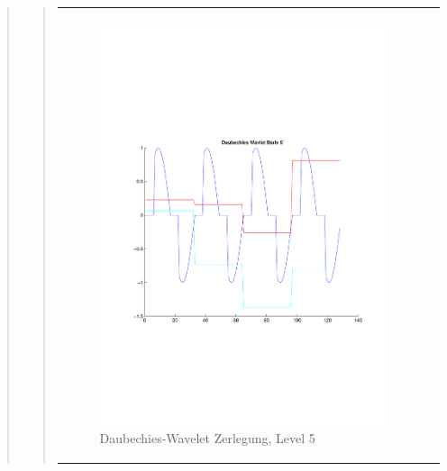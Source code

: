 \begin{quote}
\begin{quote}
\begin{center}
\begin{tabular}{ll}
\begin{minipage}{0.6\textwidth}
                    \end{minipage}
                    \begin{minipage}{0.6\textwidth}
    
                        \begin{figure}[H]
                            \label{fig:}
                            \includegraphics[scale=0.45, trim = 0.8cm 6cm 3cm
                            7.5cm,
                            clip]{./Bilder/Termin8/Daubechies_Wavlet_lvl_5}
                            \caption{Daubechies-Wavelet Zerlegung, Level 5}
                        \end{figure}
                    \vspace{-1.5em}
    
                    \end{minipage}
    

\end{tabular}
\end{center}
\end{quote}
\end{quote}
